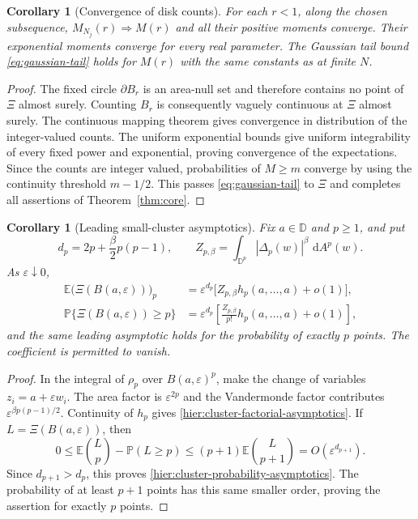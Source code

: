 \documentclass[11pt,a4paper]{article}
\numberwithin{equation}{section}
\newtheorem{corollary}[theorem]{Corollary}
\theoremstyle{definition}
\theoremstyle{remark}
\newcommand{\D}{\mathbb D}
\newcommand{\E}{\mathbb E}
\newcommand{\Pbb}{\mathbb P}
\newcommand{\dd}{\,\mathrm d}
\begin{document}
\begin{corollary}[Convergence of disk counts]\label{hier:disk-counts}
For each $r<1$, along the chosen subsequence,
$M_{N_j}(r)\Rightarrow M(r)$ and all their positive moments converge.
Their exponential moments converge for every real parameter. The
Gaussian tail bound \eqref{eq:gaussian-tail} holds for $M(r)$ with
the same constants as at finite $N$.
\end{corollary}
\begin{proof}
The fixed circle $\partial B_r$ is an area-null set and therefore
contains no point of $\Xi$ almost surely. Counting $B_r$ is consequently
vaguely continuous at $\Xi$ almost surely. The continuous mapping theorem
gives convergence in distribution of the integer-valued counts. The
uniform exponential bounds give uniform integrability of every fixed
power and exponential, proving convergence of the expectations.
Since the counts are integer valued, probabilities of $M\geq m$
converge by using the continuity threshold $m-1/2$. This passes
\eqref{eq:gaussian-tail} to $\Xi$ and completes all assertions of
Theorem~\ref{thm:core}.
\end{proof}

\begin{corollary}[Leading small-cluster asymptotics]
\label{cor:hier-cluster-asymptotics}
Fix $a\in\D$ and $p\ge1$, and put
\[
 d_p=2p+\frac\beta2p(p-1),\qquad
 Z_{p,\beta}=\int_{\D^p}|\Delta_p(w)|^\beta\,\dd A^p(w).
\]
As $\varepsilon\downarrow0$,
\begin{align}
 \E\bigl(\Xi(B(a,\varepsilon))\bigr)_p
 &=\varepsilon^{d_p}
      \bigl[Z_{p,\beta}h_p(a,\ldots,a)+o(1)\bigr],
 \label{hier:cluster-factorial-asymptotics}\\
 \Pbb\{\Xi(B(a,\varepsilon))\ge p\}
 &=\varepsilon^{d_p}
      \left[\frac{Z_{p,\beta}}{p!}h_p(a,\ldots,a)+o(1)\right],
 \label{hier:cluster-probability-asymptotics}
\end{align}
and the same leading asymptotic holds for the probability of exactly
$p$ points.  The coefficient is permitted to vanish.
\end{corollary}

\begin{proof}
In the integral of $\rho_p$ over $B(a,\varepsilon)^p$, make the
change of variables $z_i=a+\varepsilon w_i$.  The area factor is
$\varepsilon^{2p}$ and the Vandermonde factor contributes
$\varepsilon^{\beta p(p-1)/2}$.  Continuity of $h_p$ gives
\eqref{hier:cluster-factorial-asymptotics}.  If
$L=\Xi(B(a,\varepsilon))$, then
\[
 0\le\E\binom Lp-\Pbb(L\ge p)
 \le(p+1)\E\binom L{p+1}
 =O(\varepsilon^{d_{p+1}}).
\]
Since $d_{p+1}>d_p$, this proves
\eqref{hier:cluster-probability-asymptotics}.  The probability of
at least $p+1$ points has this same smaller order, proving the
assertion for exactly $p$ points.
\end{proof}
\end{document}

